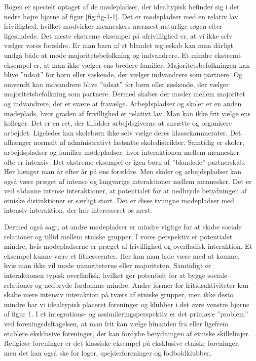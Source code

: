 \documentclass[
]{book}
\begin{document}
Bogen er specielt optaget af de mødepladser, der idealtypisk befinder sig i det nedre højre hjørne af figur \ref{fig:fig-1-1}. Det er mødepladser med en relativ lav frivillighed, hvilket modvirker menneskers nærmest naturlige søgen efter ligesindede. Det meste ekstreme eksempel på ufrivillighed er, at vi ikke selv vælger vores forældre. Er man barn af et blandet ægteskab kan man dårligt undgå både at møde majoritetsbefolkning og indvandrere. Et mindre ekstremt eksempel er, at man ikke vælger ens bredere familier. Majoritetsbefolkningen kan blive ''udsat'' for børn eller søskende, der vælger indvandrere som partnere. Og omvendt kan indvandrere blive ''udsat'' for børn eller søskende, der vælger majoritetsbefolkning som partnere. Dermed skabes der møder mellem majoritet og indvandrere, der er svære at fravælge. Arbejdspladser og skoler er en anden mødeplads, hvor graden af frivillighed er relativt lav. Man kan ikke frit vælge ens kolleger. Det er en ret, der tilfalder arbejdsgiverne at ansætte og organisere arbejdet. Ligeledes kan skolebørn ikke selv vælge deres klassekammerater. Det afhænger normalt af administrativt fastsatte skoledistrikter. Samtidig er skoler, arbejdspladser og familier mødepladser, hvor interaktionen mellem mennesker ofte er intensiv. Det ekstreme eksempel er igen børn af ''blandede'' partnerskab. Her hænger man år efter år på ens forældre. Men skoler og arbejdspladser kan også være præget af intense og langvarige interaktioner mellem mennesker. Det er ved sådanne intense interaktioner, at potentialet for at nedbryde betydningen af etniske distinktioner er særligt stort. Det er disse tvungne mødepladser med intensiv interaktion, der har interesseret os mest.

Dermed også sagt, at andre mødepladser er mindre vigtige for at skabe sociale relationer og tillid mellem etniske grupper. I vores perspektiv er potentialet mindre, hvis mødepladserne er præget af frivillighed og overfladisk interaktion. Et eksempel kunne være et fitnesscenter. Her kan man lade være med at komme, hvis man ikke vil møde minoriteterne eller majoriteten. Samtidigt er interaktionen typisk overfladisk, hvilket gør potentielt for at bygge sociale relationer og nedbryde fordomme mindre. Andre former for fritidsaktiviteter kan skabe mere intensiv interaktion på tværs af etniske grupper, men ikke desto mindre har vi idealtypisk placeret foreninger og klubber i det øvre venstre hjørne af figur 1. I et integrations- og assimileringsperspektiv er det primære ''problem'' ved foreningsdeltagelsen, at man frit kan vælge hinanden fra eller ligefrem etablere eksklusive foreninger, der kan fordybe betydningen af etniske skillelinjer. Religiøse foreninger er det klassiske eksempel på eksklusive etniske foreninger, men det kan også ske for loger, spejderforeninger og fodboldklubber.
\end{document}
